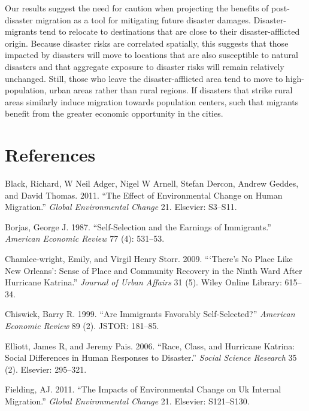 \documentclass[]{article}
\begin{document}
Our results suggest the need for caution when projecting the benefits of
post-disaster migration as a tool for mitigating future disaster
damages. Disaster-migrants tend to relocate to destinations that are
close to their disaster-afflicted origin. Because disaster risks are
correlated spatially, this suggests that those impacted by disasters
will move to locations that are also susceptible to natural disasters
and that aggregate exposure to disaster risks will remain relatively
unchanged. Still, those who leave the disaster-afflicted area tend to
move to high-population, urban areas rather than rural regions. If
disasters that strike rural areas similarly induce migration towards
population centers, such that migrants benefit from the greater economic
opportunity in the cities.

\newpage

\section{References}\label{references}

\hypertarget{refs}{}
\hypertarget{ref-black2011effect}{}
Black, Richard, W Neil Adger, Nigel W Arnell, Stefan Dercon, Andrew
Geddes, and David Thomas. 2011. ``The Effect of Environmental Change on
Human Migration.'' \emph{Global Environmental Change} 21. Elsevier:
S3--S11.

\hypertarget{ref-borjas1987self}{}
Borjas, George J. 1987. ``Self-Selection and the Earnings of
Immigrants.'' \emph{American Economic Review} 77 (4): 531--53.

\hypertarget{ref-chamlee2009there}{}
Chamlee-wright, Emily, and Virgil Henry Storr. 2009. ```There's No Place
Like New Orleans': Sense of Place and Community Recovery in the Ninth
Ward After Hurricane Katrina.'' \emph{Journal of Urban Affairs} 31 (5).
Wiley Online Library: 615--34.

\hypertarget{ref-chiswick1999immigrants}{}
Chiswick, Barry R. 1999. ``Are Immigrants Favorably Self-Selected?''
\emph{American Economic Review} 89 (2). JSTOR: 181--85.

\hypertarget{ref-elliott2006race}{}
Elliott, James R, and Jeremy Pais. 2006. ``Race, Class, and Hurricane
Katrina: Social Differences in Human Responses to Disaster.''
\emph{Social Science Research} 35 (2). Elsevier: 295--321.

\hypertarget{ref-fielding2011impacts}{}
Fielding, AJ. 2011. ``The Impacts of Environmental Change on Uk Internal
Migration.'' \emph{Global Environmental Change} 21. Elsevier:
S121--S130.
\end{document}
